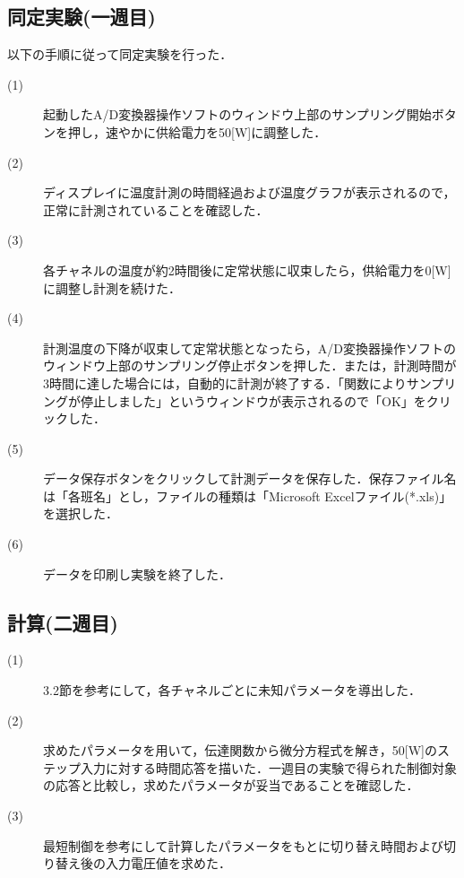 \documentclass[12pt]{jsarticle}
\begin{document}
\subsection{同定実験(一週目)}
以下の手順に従って同定実験を行った．
\begin{description}
  \item[(1)]起動したA/D変換器操作ソフトのウィンドウ上部のサンプリング開始ボタンを押し，速やかに供給電力を50[W]に調整した．
  \item[(2)]ディスプレイに温度計測の時間経過および温度グラフが表示されるので，正常に計測されていることを確認した．
  \item[(3)]各チャネルの温度が約2時間後に定常状態に収束したら，供給電力を0[W]に調整し計測を続けた．
  \item[(4)]計測温度の下降が収束して定常状態となったら，A/D変換器操作ソフトのウィンドウ上部のサンプリング停止ボタンを押した．または，計測時間が3時間に達した場合には，自動的に計測が終了する．「関数によりサンプリングが停止しました」というウィンドウが表示されるので「OK」をクリックした．
  \item[(5)]データ保存ボタンをクリックして計測データを保存した．保存ファイル名は「各班名」とし，ファイルの種類は「Microsoft Excelファイル(*.xls)」を選択した．
  \item[(6)]データを印刷し実験を終了した．
\end{description}
\subsection{計算(二週目)}
\begin{description}
  \item[(1)]3.2節を参考にして，各チャネルごとに未知パラメータを導出した．
  \item[(2)]求めたパラメータを用いて，伝達関数から微分方程式を解き，50[W]のステップ入力に対する時間応答を描いた．一週目の実験で得られた制御対象の応答と比較し，求めたパラメータが妥当であることを確認した．
  \item[(3)]最短制御を参考にして計算したパラメータをもとに切り替え時間および切り替え後の入力電圧値を求めた．
\end{description}
\end{document}
